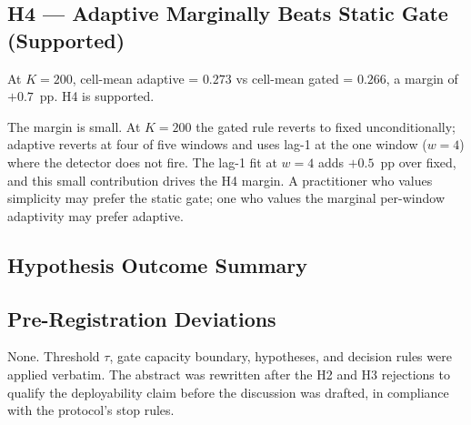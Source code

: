 \subsection{H4 --- Adaptive Marginally Beats Static Gate (Supported)}

At $K = 200$, cell-mean \textsf{adaptive} = $0.273$ vs cell-mean
\textsf{gated} = $0.266$, a margin of $+0.7$~pp. H4 is supported.

The margin is small. At $K = 200$ the \textsf{gated} rule reverts to
\textsf{fixed} unconditionally; \textsf{adaptive} reverts at four of
five windows and uses lag-1 at the one window ($w = 4$) where the
detector does not fire. The lag-1 fit at $w = 4$ adds $+0.5$~pp over
fixed, and this small contribution drives the H4 margin. A
practitioner who values simplicity may prefer the static gate; one
who values the marginal per-window adaptivity may prefer
\textsf{adaptive}.

\subsection{Hypothesis Outcome Summary}



\subsection{Pre-Registration Deviations}

None. Threshold $\tau$, gate capacity boundary, hypotheses, and
decision rules were applied verbatim. The abstract was rewritten
after the H2 and H3 rejections to qualify the deployability claim
before the discussion was drafted, in compliance with the protocol's
stop rules.
